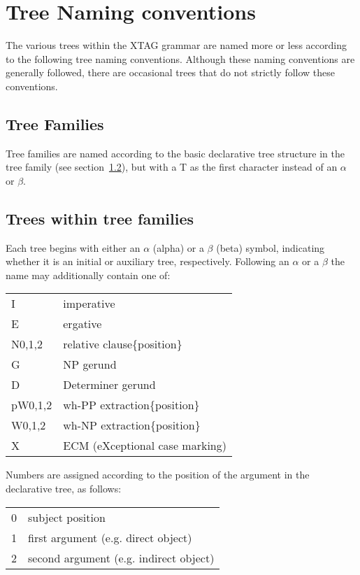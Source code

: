 \chapter{Tree Naming conventions}
\label{tree-naming}

The various trees within the XTAG grammar are named more or less according to
the following tree naming conventions.  Although these naming conventions are
generally followed, there are occasional trees that do not strictly follow
these conventions.

\section{Tree Families}
Tree families are named according to the basic declarative tree structure in
the tree family (see section~\ref{family-trees}), but with a T as the first
character instead of an $\alpha$ or $\beta$.

\section{Trees within tree families}
\label{family-trees}

Each tree begins with either an $\alpha$ (alpha) or a $\beta$ (beta) symbol,
indicating whether it is an initial or auxiliary tree, respectively.  Following
an $\alpha$ or a $\beta$ the name may additionally contain one of:

\begin{description}
\item\begin{tabular}{ll}
I&imperative\\
E&ergative\\
N{0,1,2}&relative clause\{position\}\\
G&NP gerund\\
D&Determiner gerund\\
pW{0,1,2}&wh-PP extraction\{position\}\\
W{0,1,2}&wh-NP extraction\{position\}\\
X&ECM (eXceptional case marking)\\
\end{tabular}
\end{description}

\noindent Numbers are assigned according to the position of the argument in the
declarative tree, as follows:

\begin{description}
\item\begin{tabular}{ll}
0&subject position\\
1&first argument (e.g. direct object)\\
2&second argument (e.g. indirect object)\\
\end{tabular}
\end{description}

